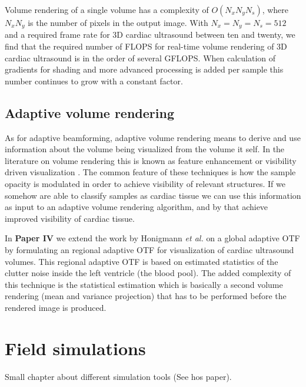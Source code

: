 Volume rendering of a single volume has a complexity of $O(N_xN_yN_s)$, where $N_xN_y$ is the number of pixels in the output image. With $N_x = N_y = N_s = 512$ and a required frame rate for 3D cardiac ultrasound between ten and twenty, we find that the required number of FLOPS for real-time volume rendering of 3D cardiac ultrasound is in the order of several GFLOPS. When calculation of gradients for shading and more advanced processing is added per sample this number continues to grow with a constant factor.

\subsection{Adaptive volume rendering}
As for adaptive beamforming, adaptive volume rendering means to derive and use information about the volume being visualized from the volume it self. In the literature on volume rendering this is known as feature enhancement or visibility driven visualization \cite{viola2005, correa2010visibility, marchesin2010}. The common feature of these techniques is how the sample opacity is modulated in order to achieve visibility of relevant structures. If we somehow are able to classify samples as cardiac tissue we can use this information as input to an adaptive volume rendering algorithm, and by that achieve improved visibility of cardiac tissue.

In \textbf{Paper IV} we extend the work by Honigmann \textit{et al.} \cite{Honigmann2003} on a global adaptive OTF by formulating an regional adaptive OTF for visualization of cardiac ultrasound volumes. This regional adaptive OTF is based on estimated statistics of the clutter noise inside the left ventricle (the blood pool). The added complexity of this technique is the statistical estimation which is basically a second volume rendering (mean and variance projection) that has to be performed before the rendered image is produced.

\section{Field simulations}\label{sec:field}

Small chapter about different simulation tools (See hos paper).
			
\endinput
